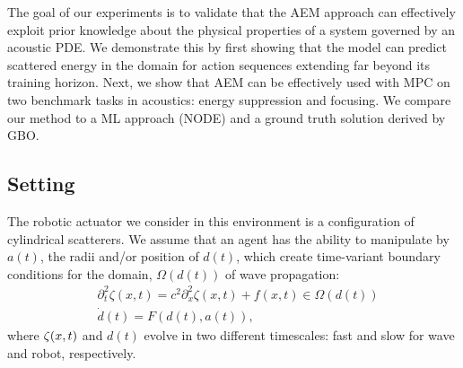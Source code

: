 The goal of our experiments is to validate that the AEM approach can effectively exploit prior knowledge about the physical properties of a system governed by an acoustic PDE. We demonstrate this by first showing that the model can predict scattered energy in the domain for action sequences extending far beyond its training horizon. Next, we show that AEM can be effectively used with MPC on two benchmark tasks in acoustics: energy suppression and focusing. We compare our method to a ML approach (NODE) and a ground truth solution derived by GBO. 


\iffalse
GBO is a widely recognized technique in acoustic research \cite{Treweek2022,Ewees23,Blankrot2019,AmirkulovaNorris17b,math9222862,Amirkulova_Gerges_Norris_2022,GergesAmirkulova2024} which provides optimal solutions with large design space\cite{HU2020113387}. 
However, GBO demands extensive domain knowledge, including the precise definition of a closed form solution, which significantly restricts its applicability to situations where this form is already well-defined\cite{AmirkulovaNorris17b, Amirkulova_etal2021, Amirkulova_Gerges_Norris_2022,GergesAmirkulova2024}. Moreover, the method is effective only when the system state is fully observable. To enhance computational efficiency, GBO also requires the gradients of the objective function and the non-linear constraints. Obtaining these gradients is often a complex and challenging task, especially in cases where the function or constraints are highly non-linear or analytically intractable, further complicating the application of GBO. 
\fi

\subsection{Setting}

The robotic actuator we consider in this environment is a configuration of cylindrical scatterers. We assume that an agent has the ability to manipulate by $a(t)$, the radii and/or position of $d(t)$, which create time-variant boundary conditions for the domain, $\Omega(d(t))$ of wave propagation:
\begin{align*}
    &\partial_t^2\zeta(x, t) = c^2\partial_x^2\zeta(x, t) + f(x, t) \in \Omega(d(t))\\
    &\dot{d}(t) = F(d(t), a(t)),
\end{align*}
where $\zeta(x, t)$ and $d(t)$ evolve in two different timescales: fast  and slow for wave and robot, respectively.


